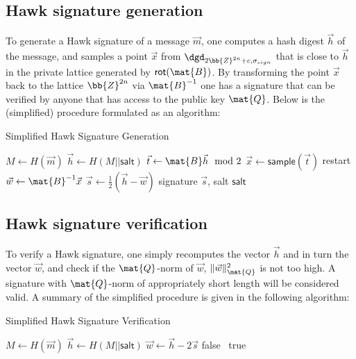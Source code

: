 \subsection{Hawk signature generation}
To generate a Hawk signature of a message $\vec{m}$, one computes a hash digest $\vec{h}$ of the message, and samples a point $\vec{x}$ from $\dgd_{2\bb{Z}^{2n} + c, \sigma_{sign}}$ that is close to $\vec{h}$ in the 
private lattice generated by $\mathsf{rot}(\mat{B})$. By transforming the point $\vec{x}$ back to the lattice $\bb{Z}^{2n}$ via $\mat{B}^{-1}$ one has a signature that can be verified 
by anyone that has access to the public key $\mat{Q}$.
Below is the (simplified) procedure formulated as an algorithm:
\begin{algorithm}
\caption{Simplified Hawk Signature Generation}
\begin{algorithmic}[1]
    \State $M \gets H(\vec{m})$ 
    \State $\vec{h} \gets H(M || \mathsf{salt})$ 
    \State $\vec{t} \gets \mat{B} \vec{h} \mod 2$ 
    \State $\vec{x} \gets \mathsf{sample}(\vec{t})$
    \State restart
    \Else
    \State $\vec{w} \gets \mat{B}^{-1} \vec{x}$
    \State $\vec{s} \gets \frac{1}{2}(\vec{h} - \vec{w})$
    \State \Return signature $\vec{s}$, salt $\mathsf{salt}$
    \EndIf
\end{algorithmic}
\end{algorithm}
\subsection{Hawk signature verification}
To verify a Hawk signature, one simply recomputes the vector $\vec{h}$ and in turn the vector $\vec{w}$, and check if the $\mat{Q}$-norm of $\vec{w}$,
$\lVert \vec{w} \rVert_{\mat{Q}}^2$ is not too high. A signature with $\mat{Q}$-norm of appropriately short length will be considered valid.
A summary of the simplified procedure is given in the following algorithm:

\begin{algorithm}
\caption{Simplified Hawk Signature Verification}
\begin{algorithmic}[1]
    \State $M \gets H(\vec{m})$ 
    \State $\vec{h} \gets H(M || \mathsf{salt})$
    \State $\vec{w} \gets \vec{h} - 2\vec{s}$
    \State \Return false
    \Else \ \Return true
    \EndIf
\end{algorithmic}
\end{algorithm}

